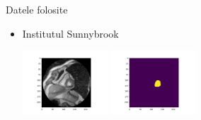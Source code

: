 \documentclass[xcolor=svgnames,handout]{beamer}
\begin{document}
\begin{frame}
  {Datele folosite}
  
  \begin{itemize}
  \item Institutul Sunnybrook
      
    \begin{center}
        \includegraphics[width=120]{1_image.png}
        \includegraphics[width=120]{1_labels.png}  
    \end{center}
    

\end{itemize}
\end{frame}
\end{document}
